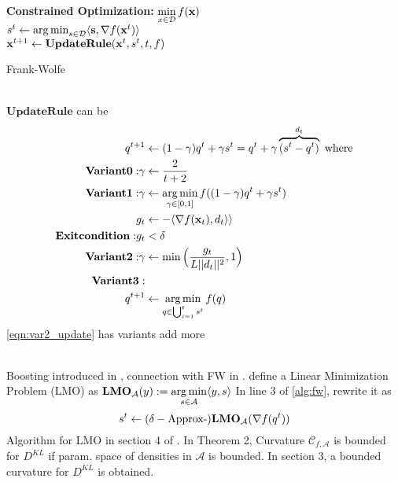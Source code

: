  \INPROGRESS
  \cite{jaggi2013revisiting} \cite{pedregosa2018frank} 
  \cite{pedregosa2018step} \cite{doi:10.1002/zamm.19730530723}
\begin{algorithm}[h]
  \textbf{Constrained Optimization:} $\min\limits_{x \in \mathcal{D}} f(\mathbf{x})$ \\
   {
    $s^t \gets \operatorname*{arg\,min}_{s \in \mathcal{D}}\langle \mathbf{s}, \nabla f(\mathbf{x}^{t}) \rangle$ \\
    $\mathbf{x}^{t + 1} \gets \mathbf{UpdateRule}(\mathbf{x}^t, s^t, t, f)$
  }
\caption{Frank-Wolfe}
\label{alg:fw}
\end{algorithm}
\\
$\mathbf{UpdateRule}$ can be
\begin{align}
  q^{t + 1} &\gets (1 - \gamma) q^t + \gamma s^t = q^t + \gamma\overbrace{(s^t - q^t)}^{d_t} 
\textrm{ where}\nonumber\\
\mathbf{Variant 0:} 
  \gamma &\gets \frac{2}{t + 2} \\
\mathbf{Variant 1:}
  \gamma &\gets \operatorname*{arg\,min}\limits_{\gamma \in [0, 1]} f((1 - \gamma) q^t + \gamma s^t)
  \label{eqn:update_lsearch} \\
g_t &\gets -\langle \nabla f(\mathbf{x}_t), d_t \rangle \rangle \nonumber\\
\mathbf{Exit condition:} g_t &< \delta \nonumber\\
\mathbf{Variant 2:} \gamma &\gets \min \Big(\frac{g_t}{L ||d_t|| ^2}, 1\Big)
\label{eqn:var2_update} \\
\mathbf{Variant 3:} \nonumber\\
  q^{t + 1} &\gets \operatorname*{arg\,min}\limits_{q \in \bigcup_{i=1}^{t}{s^t}}f(q) \nonumber\\
\end{align}
\ref{eqn:var2_update} has variants \cite{pedregosa2018frank} \cite{Demyanov70} \TODO add more

 \INPROGRESS \\
Boosting introduced in \cite{guo2016boosting}, connection with FW in \cite{locatello2017boosting}.
define a Linear Minimization Problem (LMO) as
$
\mathbf{LMO}_{\mathcal{A}}(y) := \operatorname*{arg\,min}\limits_{s \in \mathcal{A}} \langle y, s \rangle
$
In line 3 of \ref{alg:fw}, rewrite it as
$$
s^t \gets (\delta-\text{Approx-})\mathbf{LMO}_{\mathcal{A}}(\nabla f(q^t))
$$
Algorithm for LMO in section 4 of \cite{locatello2018boosting}. In Theorem 2,
Curvature $\mathcal{C}_{f,\mathcal{A}}$ is bounded for $D^{KL}$ if param. space of
densities in $\mathcal{A}$ is bounded. In section 3, a bounded curvature for
  $D^{KL}$ is obtained.
  
